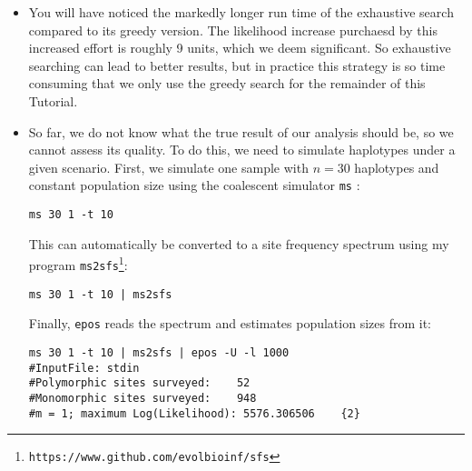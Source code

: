 \documentclass[a4paper, english]{article}
\newcommand{\ty}{\texttt}
\begin{document}
\begin{itemize}
\begin{verbatim}
#Final Log(Likelihood):          150958643.053014
#d^2:                              0.00185004
#Level  T[Level]        N[Level]
13      4.51e+03        2.26e+04
12      8.35e+03        1.27e+05
5       8.80e+03        7.01e+02
2       3.62e+04        9.15e+03
\end{verbatim}
The option \ty{-E 30} indicates that up to 30 levels, that is all
possible levels in the coalescent, can be added by exhaustive
search. The first two rounds are always the same as under the greedy
regime. However, at $m=3$ level 11 from the previous round is dropped
and levels 4 and 9 are added. The increase is roughly 6.7 units,
which is more than the 2 units required for the acceptance of a new
level, the search continues to $m=4$. Here levels 4 and 9 from the
previous round are replaced by levels 5, 12, and 13 leading to a
likelihood increase by 2.3 a fifth and final round of, $m=5$. Here
levels 5, 12, and 13 are replaced by 6, 14, 15, and 24, but the
likelihood increase is less than one and, the search is stopped, and
we get the result for $m=4$.
\item You will have noticed the markedly longer run time of the
  exhaustive search compared to its greedy version. The likelihood
  increase purchaesd by this increased effort is roughly 9 units,
  which we deem significant. So exhaustive searching can lead to
  better results, but in practice this strategy is so time consuming
  that we only use the greedy search for the remainder of this
  Tutorial. 
\item So far, we do not know what the true result of our analysis
  should be, so we cannot assess its quality. To do this, we need to
  simulate haplotypes under a given scenario. First, we simulate one
  sample with $n=30$ haplotypes and constant population size using the
  coalescent simulator \ty{ms} \citep{hud02:gen}:
\begin{verbatim}
ms 30 1 -t 10 
\end{verbatim}
This can automatically be converted to a site frequency spectrum using
my program \ty{ms2sfs}\footnote{\ty{https://www.github.com/evolbioinf/sfs}}:
\begin{verbatim}
ms 30 1 -t 10 | ms2sfs
\end{verbatim}
Finally, \ty{epos} reads the spectrum and estimates population
sizes from it:
\begin{verbatim}
ms 30 1 -t 10 | ms2sfs | epos -U -l 1000
#InputFile:	stdin
#Polymorphic sites surveyed:	52
#Monomorphic sites surveyed:	948
#m = 1; maximum Log(Likelihood): 5576.306506	{2}

\end{verbatim}
\end{itemize}
\end{document}

